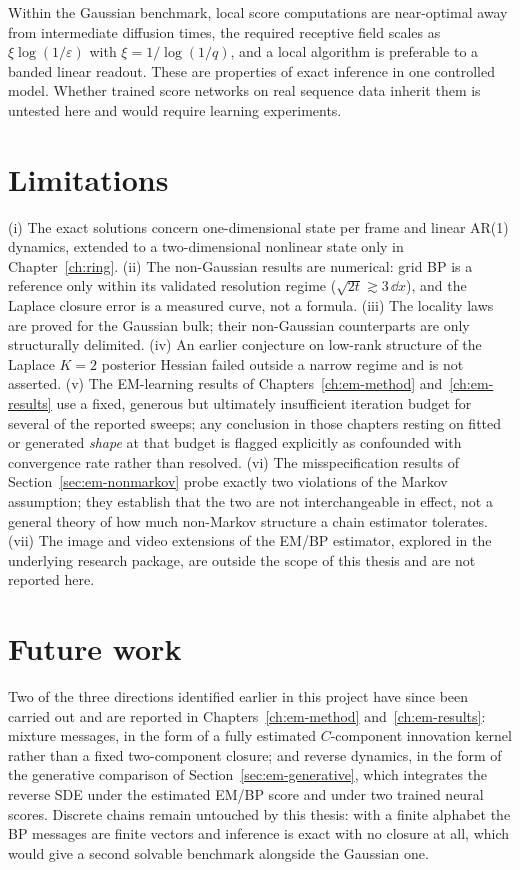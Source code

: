 Within the Gaussian benchmark, local score computations are near-optimal
away from intermediate diffusion times, the required receptive field
scales as $\xi \log(1/\varepsilon)$ with $\xi = 1/\log(1/q)$, and a
local algorithm is preferable to a banded linear readout. These are
properties of exact inference in one controlled model. Whether trained
score networks on real sequence data inherit them is untested here and
would require learning experiments.

\section{Limitations}

(i) The exact solutions concern one-dimensional state per frame and
linear AR(1) dynamics, extended to a two-dimensional nonlinear state only
in Chapter~\ref{ch:ring}. (ii) The non-Gaussian results are numerical: grid
BP is a reference only within its validated resolution regime
($\sqrt{2t} \gtrsim 3\,\dd x$), and the Laplace closure error is a
measured curve, not a formula. (iii) The locality laws are proved for
the Gaussian bulk; their non-Gaussian counterparts are only structurally
delimited. (iv) An earlier conjecture on low-rank structure of the Laplace
$K = 2$ posterior Hessian failed outside a narrow regime and is not
asserted. (v) The EM-learning results of Chapters~\ref{ch:em-method}
and~\ref{ch:em-results} use a fixed, generous but ultimately insufficient
iteration budget for several of the reported sweeps; any conclusion in
those chapters resting on fitted or generated \emph{shape} at that budget
is flagged explicitly as confounded with convergence rate rather than
resolved. (vi) The misspecification results of
Section~\ref{sec:em-nonmarkov} probe exactly two violations of the Markov
assumption; they establish that the two are not interchangeable in effect,
not a general theory of how much non-Markov structure a chain estimator
tolerates. (vii) The image and video extensions of the EM/BP estimator,
explored in the underlying research package, are outside the scope of
this thesis and are not reported here.

\section{Future work}

Two of the three directions identified earlier in this project have since
been carried out and are reported in Chapters~\ref{ch:em-method}
and~\ref{ch:em-results}: mixture messages, in the form of a fully estimated
$C$-component innovation kernel rather than a fixed two-component closure;
and reverse dynamics, in the form of the generative comparison of
Section~\ref{sec:em-generative}, which integrates the reverse SDE under the
estimated EM/BP score and under two trained neural scores. Discrete chains
remain untouched by this thesis: with a finite alphabet the BP messages are
finite vectors and inference is exact with no closure at all, which would
give a second solvable benchmark alongside the Gaussian one.

